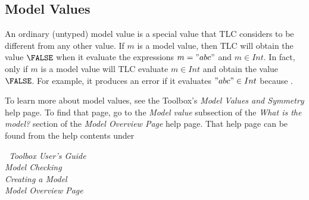 \documentclass[fleqn,leqno]{article}
\begin{document}
 \vspace{-2\baselineskip}%
\subsection*{Model Values} 

An ordinary (untyped) model value is a special value that TLC
considers to be different from any other value.  If $m$ is a model
value, then TLC will obtain the value $\FALSE$ when it evaluate the
expressions $m = "abc"$ and $m\in Int$.  In fact, only if $m$ is a
model value will TLC evaluate $m\in Int$ and obtain the value
$\FALSE$.  For example, it produces an error if it evaluates $"abc"\in
Int$ because .

\medskip \noindent
%
To learn more about model values, see the Toolbox's \emph{Model Values and
Symmetry} help page.  To find that page, go to the \emph{Model value}
subsection of the \emph{What is the model?} section of the \emph{Model
Overview Page} help page.  That help page can be found from the help
contents under
\begin{display} \it
\tlaplus\ Toolbox User's Guide\\
Model Checking \\
Creating a Model \\
Model Overview Page 
\end{display}
\end{document}

